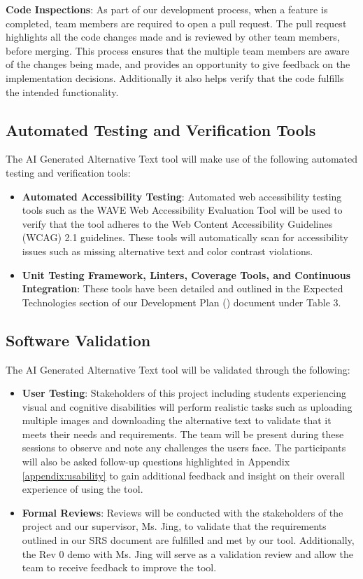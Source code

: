 \documentclass[12pt, titlepage]{article}
\begin{document}
\textbf{Code Inspections}:
As part of our development process, when a feature is completed, team members are required to open a pull request. The pull request highlights all the code changes made and is reviewed by other team members, before merging. 
This process ensures that the multiple team members are aware of the changes being made, and provides an opportunity to give feedback on 
the implementation decisions. Additionally it also helps verify that the code fulfills the intended functionality.

\subsection{Automated Testing and Verification Tools}
The AI Generated Alternative Text tool will make use of the following automated testing and verification tools: 
\begin{itemize}
  \item \textbf{Automated Accessibility Testing}: Automated web accessibility testing tools such as the WAVE Web Accessibility Evaluation Tool will be used to 
  verify that the tool adheres to the Web Content Accessibility Guidelines (WCAG) 2.1 guidelines. These tools will automatically scan for accessibility issues such as missing alternative text and color contrast violations.
  \item \textbf{Unit Testing Framework, Linters, Coverage Tools, and Continuous Integration}: These tools have been detailed and outlined in the Expected Technologies section
  of our Development Plan (\citet{DP}) document under Table 3. 
\end{itemize}

\subsection{Software Validation}
The AI Generated Alternative Text tool will be validated through the following: 
\begin{itemize}
  \item \textbf{User Testing}: Stakeholders of this project including students experiencing visual 
  and cognitive disabilities will perform realistic tasks such as uploading multiple images and downloading the alternative text
to validate that it meets their needs and requirements. 
  The team will be present during these sessions to observe and note any challenges 
  the users face. The participants will also be asked follow-up questions highlighted in Appendix \ref{appendix:usability} to gain additional feedback and insight
  on their overall experience of using the tool. 
  \item \textbf{Formal Reviews}: Reviews will be conducted with the stakeholders of the project and our supervisor, Ms. Jing, to validate that the requirements
  outlined in our SRS document are fulfilled and met by our tool. Additionally, the Rev 0 demo with Ms. Jing will serve as a validation review and allow the team 
  to receive feedback to improve the tool. 
\end{itemize} 
\end{document}
